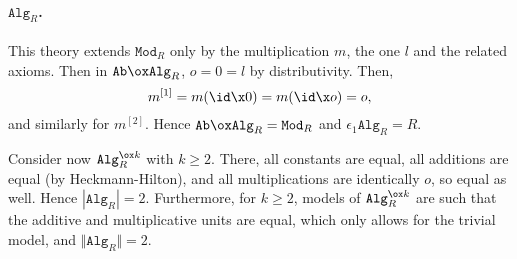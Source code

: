 \documentclass[a4paper, 12pt]{article}
\newcommand{\theory}{\mathtt}
\begin{document}
\paragraph*{$\theory{Alg}_R$.} This theory extends $\theory{Mod}_R$ only by the multiplication $m$, the one $l$ and the related axioms. Then in $\theory{Ab} \ox \theory{Alg}_R$, $o = 0 = l$ by distributivity. Then,
\[ m^{[1]} = m (\id \x 0) = m (\id \x o) = o, \]
and similarly for $m^{[2]}$. Hence $\theory{Ab} \ox \theory{Alg}_R = \theory{Mod}_R$ and $\epsilon_1 \theory{Alg}_R = R$.

Consider now $\theory{Alg}_R^{\ox k}$ with $k \geq 2$. There, all constants are equal, all additions are equal (by Heckmann-Hilton), and all multiplications are identically $o$, so equal as well. Hence $| \theory{Alg}_R | = 2$. Furthermore, for $k \geq 2$, models of $\theory{Alg}_R^{\ox k}$ are such that the additive and multiplicative units are equal, which only allows for the trivial model, and $\Vert \theory{Alg}_R \Vert = 2$.


\nocite{*}


\end{document}
